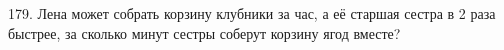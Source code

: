 179. Лена  может собрать корзину клубники за час, а её старшая сестра в 2 раза быстрее, за сколько минут сестры соберут корзину ягод вместе?\\
